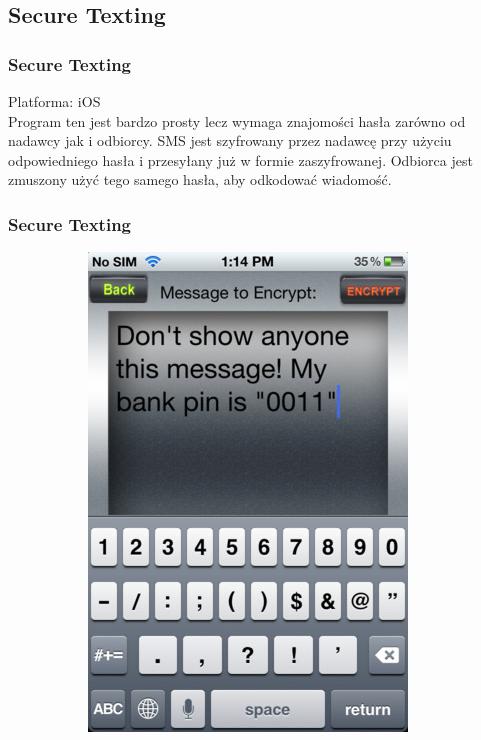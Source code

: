 \documentclass[xcolor=table]{beamer}
\begin{document}
\subsection{Secure Texting}

\begin{frame}
  \frametitle{Secure Texting}
	
	Platforma: iOS\\
	Program ten jest bardzo prosty lecz wymaga znajomości hasła zarówno 
	od nadawcy jak i odbiorcy. SMS jest szyfrowany przez nadawcę przy użyciu 
	odpowiedniego hasła i przesyłany już w formie zaszyfrowanej. 
	Odbiorca jest zmuszony użyć tego samego hasła, aby odkodować wiadomość.
\end{frame}
\begin{frame}
  \frametitle{Secure Texting}
    \begin{center}
        \begin{figure}
          \centering
            \begin{subfigure}[b]{0.4\textwidth}
               \centering
               \includegraphics[width=\textwidth]{secure_texting_1}

\end{subfigure}
\end{figure}
\end{center}
\end{frame}
\end{document}

